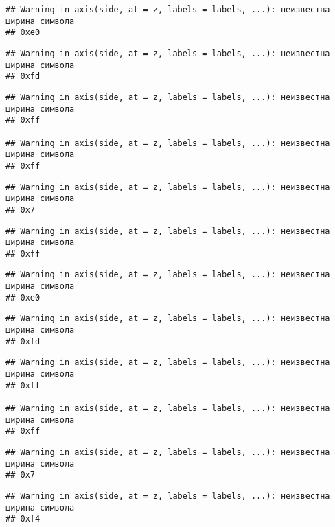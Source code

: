 \documentclass[
]{article}
\begin{document}
\begin{verbatim}
## Warning in axis(side, at = z, labels = labels, ...): неизвестна ширина символа
## 0xe0
\end{verbatim}

\begin{verbatim}
## Warning in axis(side, at = z, labels = labels, ...): неизвестна ширина символа
## 0xfd
\end{verbatim}

\begin{verbatim}
## Warning in axis(side, at = z, labels = labels, ...): неизвестна ширина символа
## 0xff

## Warning in axis(side, at = z, labels = labels, ...): неизвестна ширина символа
## 0xff
\end{verbatim}

\begin{verbatim}
## Warning in axis(side, at = z, labels = labels, ...): неизвестна ширина символа
## 0x7
\end{verbatim}

\begin{verbatim}
## Warning in axis(side, at = z, labels = labels, ...): неизвестна ширина символа
## 0xff
\end{verbatim}

\begin{verbatim}
## Warning in axis(side, at = z, labels = labels, ...): неизвестна ширина символа
## 0xe0
\end{verbatim}

\begin{verbatim}
## Warning in axis(side, at = z, labels = labels, ...): неизвестна ширина символа
## 0xfd
\end{verbatim}

\begin{verbatim}
## Warning in axis(side, at = z, labels = labels, ...): неизвестна ширина символа
## 0xff

## Warning in axis(side, at = z, labels = labels, ...): неизвестна ширина символа
## 0xff
\end{verbatim}

\begin{verbatim}
## Warning in axis(side, at = z, labels = labels, ...): неизвестна ширина символа
## 0x7
\end{verbatim}

\begin{verbatim}
## Warning in axis(side, at = z, labels = labels, ...): неизвестна ширина символа
## 0xf4
\end{verbatim}
\end{document}
